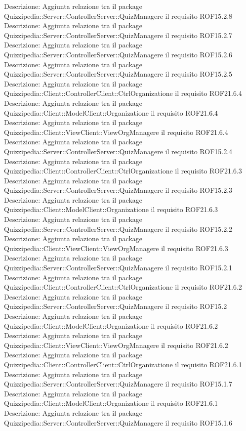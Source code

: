 Descrizione: Aggiunta relazione tra il package Quizzipedia::Server::ControllerServer::QuizManagere il requisito ROF15.2.8 
Descrizione: Aggiunta relazione tra il package Quizzipedia::Server::ControllerServer::QuizManagere il requisito ROF15.2.7 
Descrizione: Aggiunta relazione tra il package Quizzipedia::Server::ControllerServer::QuizManagere il requisito ROF15.2.6 
Descrizione: Aggiunta relazione tra il package Quizzipedia::Server::ControllerServer::QuizManagere il requisito ROF15.2.5 
Descrizione: Aggiunta relazione tra il package Quizzipedia::Client::ControllerClient::CtrlOrganizatione il requisito ROF21.6.4 
Descrizione: Aggiunta relazione tra il package Quizzipedia::Client::ModelClient::Organizatione il requisito ROF21.6.4 
Descrizione: Aggiunta relazione tra il package Quizzipedia::Client::ViewClient::ViewOrgManagere il requisito ROF21.6.4 
Descrizione: Aggiunta relazione tra il package Quizzipedia::Server::ControllerServer::QuizManagere il requisito ROF15.2.4 
Descrizione: Aggiunta relazione tra il package Quizzipedia::Client::ControllerClient::CtrlOrganizatione il requisito ROF21.6.3 
Descrizione: Aggiunta relazione tra il package Quizzipedia::Server::ControllerServer::QuizManagere il requisito ROF15.2.3 
Descrizione: Aggiunta relazione tra il package Quizzipedia::Client::ModelClient::Organizatione il requisito ROF21.6.3 
Descrizione: Aggiunta relazione tra il package Quizzipedia::Server::ControllerServer::QuizManagere il requisito ROF15.2.2 
Descrizione: Aggiunta relazione tra il package Quizzipedia::Client::ViewClient::ViewOrgManagere il requisito ROF21.6.3 
Descrizione: Aggiunta relazione tra il package Quizzipedia::Server::ControllerServer::QuizManagere il requisito ROF15.2.1 
Descrizione: Aggiunta relazione tra il package Quizzipedia::Client::ControllerClient::CtrlOrganizatione il requisito ROF21.6.2 
Descrizione: Aggiunta relazione tra il package Quizzipedia::Server::ControllerServer::QuizManagere il requisito ROF15.2 
Descrizione: Aggiunta relazione tra il package Quizzipedia::Client::ModelClient::Organizatione il requisito ROF21.6.2 
Descrizione: Aggiunta relazione tra il package Quizzipedia::Client::ViewClient::ViewOrgManagere il requisito ROF21.6.2 
Descrizione: Aggiunta relazione tra il package Quizzipedia::Client::ControllerClient::CtrlOrganizatione il requisito ROF21.6.1 
Descrizione: Aggiunta relazione tra il package Quizzipedia::Server::ControllerServer::QuizManagere il requisito ROF15.1.7 
Descrizione: Aggiunta relazione tra il package Quizzipedia::Client::ModelClient::Organizatione il requisito ROF21.6.1 
Descrizione: Aggiunta relazione tra il package Quizzipedia::Server::ControllerServer::QuizManagere il requisito ROF15.1.6 
